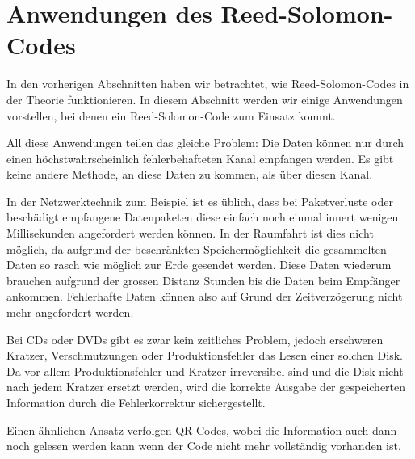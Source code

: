 %
%
%
\section{Anwendungen des Reed-Solomon-Codes
	\label{reedsolomon:section:anwendung}}

In den vorherigen Abschnitten haben wir betrachtet, wie Reed-Solomon-Codes in der Theorie funktionieren. 
In diesem Abschnitt werden wir einige Anwendungen vorstellen, bei denen ein Reed-Solomon-Code zum Einsatz kommt.

All diese Anwendungen teilen das gleiche Problem: Die Daten können nur durch einen höchstwahrscheinlich fehlerbehafteten Kanal empfangen werden. Es gibt keine andere Methode, an diese Daten zu kommen, als über diesen Kanal.

In der Netzwerktechnik zum Beispiel ist es üblich, dass bei Paketverluste oder beschädigt empfangene Datenpaketen diese einfach noch einmal innert wenigen Millisekunden angefordert werden können.
%
In der Raumfahrt ist dies nicht möglich, da aufgrund der beschränkten Speichermöglichkeit die gesammelten Daten so rasch wie möglich zur Erde gesendet werden. 
%
Diese Daten wiederum brauchen aufgrund der grossen Distanz Stunden bis die Daten beim Empfänger ankommen.
Fehlerhafte Daten können also auf Grund der Zeitverzögerung nicht mehr angefordert werden. 

Bei CDs oder DVDs gibt es zwar kein zeitliches Problem, jedoch erschweren Kratzer, Verschmutzungen oder Produktionsfehler das Lesen einer solchen Disk.
%
%
%
%
Da vor allem Produktionsfehler und Kratzer irreversibel sind und die Disk nicht nach jedem Kratzer ersetzt werden, wird die korrekte Ausgabe der gespeicherten Information durch die Fehlerkorrektur sichergestellt. 

Einen ähnlichen Ansatz verfolgen QR-Codes, wobei die Information auch dann noch gelesen werden kann wenn der Code nicht mehr vollständig vorhanden ist. 
%

%
%
%
%
%

